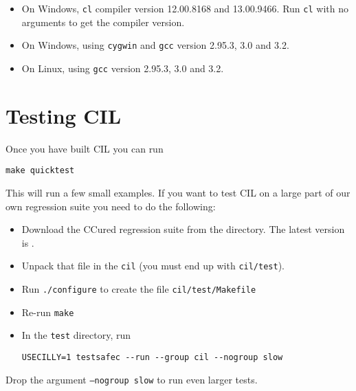 \documentclass{article}
\def\t#1{{\tt #1}}
\begin{document}

\begin{itemize}
\item On Windows, \t{cl} compiler version 12.00.8168 and 13.00.9466. 
Run \t{cl} with no arguments to get the compiler version. 
\item On Windows, using \t{cygwin} and \t{gcc} version 2.95.3, 3.0 and 3.2.
\item On Linux, using \t{gcc} version 2.95.3, 3.0 and 3.2.
\end{itemize}

  \section{Testing CIL} 
  Once you have built CIL you can run 
\begin{verbatim}
make quicktest
\end{verbatim}

  This will run a few small examples. If you want to test CIL on a large
part of our own regression suite you need to do the following:
\begin{itemize}
\item Download the CCured regression suite from the
 directory. The latest version is
.
\item Unpack that file in the \t{cil} (you must end up with \t{cil/test}).
\item Run \t{./configure} to create the file \t{cil/test/Makefile}
\item Re-run \t{make}
\item In the \t{test} directory, run
\begin{verbatim}
USECILLY=1 testsafec --run --group cil --nogroup slow
\end{verbatim}
\end{itemize}

 Drop the argument \t{--nogroup slow} to run even larger tests. 
\end{document}
